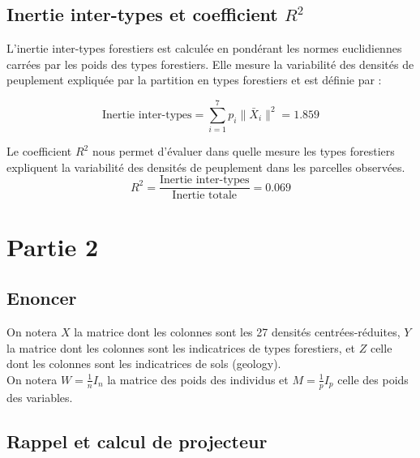\documentclass{article}
\begin{document}
\subsection{Inertie inter-types et coefficient $R^2$}


L'inertie inter-types forestiers est calculée en pondérant les normes euclidiennes carrées par les poids des types forestiers. Elle mesure la variabilité des densités de peuplement expliquée par la partition en types forestiers et est définie par :

\[
\text{Inertie inter-types} = \sum_{i=1}^{7} p_i \|\bar{X}_i\|^2 = 1.859
\]

Le coefficient $R^2$ nous permet d'évaluer dans quelle mesure les types forestiers expliquent la variabilité des densités de peuplement dans les parcelles observées.
\[
R^2 = \frac{\text{Inertie inter-types}}{\text{Inertie totale}}=0.069
\]



\newpage
\section{Partie 2}
\subsection{Enoncer}
On notera $X$ la matrice dont les colonnes sont les 27 densités centrées-réduites, $Y$ la
matrice dont les colonnes sont les indicatrices de types forestiers, et $Z$ celle dont les
colonnes sont les indicatrices de sols (geology). \\
On notera $W=\frac{1}{n}I_n$ la matrice des poids des individus et $M=\frac{1}{p}I_p$
celle des poids des variables.
\subsection{Rappel et calcul de projecteur}
\end{document}

